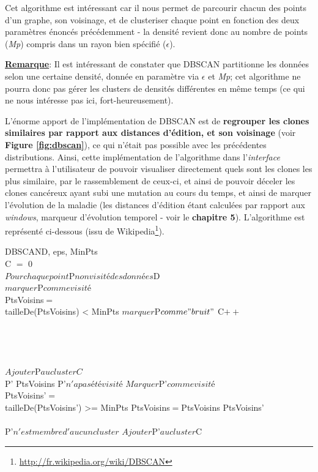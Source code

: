 \documentclass[pdftex,12pt,a4paper]{report}
\begin{document}
\begin{spacing}{1.2}
Cet algorithme est intéressant car il nous permet de parcourir chacun des points d'un graphe, son voisinage, et de clusteriser chaque point en fonction des deux paramètres énoncés précédemment - la densité revient donc au nombre de points (\textit{Mp}) compris dans un rayon bien spécifié ($\epsilon$).

\textbf{\underline{Remarque}}: Il est intéressant de constater que DBSCAN partitionne les données selon une certaine densité, donnée en paramètre via $\epsilon$ et \textit{Mp}; cet algorithme ne pourra donc pas gérer les clusters de densités différentes en même temps (ce qui ne nous intéresse pas ici, fort-heureusement).

L'énorme apport de l'implémentation de DBSCAN est de \textbf{regrouper les clones similaires par rapport aux distances d'édition, et son voisinage} (voir \textbf{Figure \ref{fig:dbscan}}), ce qui n'était pas possible avec les précédentes distributions.
Ainsi, cette implémentation de l'algorithme dans l'\textit{interface} permettra à l'utilisateur de pouvoir visualiser directement quels sont les clones les plus similaire, par le rassemblement de ceux-ci, et ainsi de pouvoir déceler les clones cancéreux ayant subi une mutation au cours du temps, et ainsi de marquer l'évolution de la maladie (les distances d'édition étant calculées par rapport aux \textit{windows}, marqueur d'évolution temporel - voir le \textbf{chapitre 5}).
\newline
L'algorithme est représenté ci-dessous (issu de Wikipedia\footnote{\url{http://fr.wikipedia.org/wiki/DBSCAN}}).

\begin{pseudocode}{DBSCAN}{D, eps, MinPts}
\\
C $=$ 0\\
$Pour chaque point $P$ non visité des données $D\\
$marquer $P$ comme visité$\\
PtsVoisins$ = $\\
\IF tailleDe(PtsVoisins) < MinPts
\THEN $marquer $P$ comme "bruit"$
\ELSE 
	\BEGIN
		C$++$\\
		\\
	\END\\
\\

\\
	$Ajouter $P$ au cluster C$\\
	\FOREACH P' \in PtsVoisins \DO
			\IF P'$ n'a pas été visité$
			\THEN 
				\BEGIN
					$Marquer $P'$ comme visité$\\
					PtsVoisins'$ = $ \\
					\IF tailleDe(PtsVoisins') >= MinPts
					\THEN PtsVoisins$ = $PtsVoisins \cup PtsVoisins'\\
				\END\\
			\IF P'$ n'est membre d'aucun cluster$
			\THEN $Ajouter $P'$ au cluster $C
\ENDPROCEDURE


\end{pseudocode}
\end{spacing}
\end{document}
